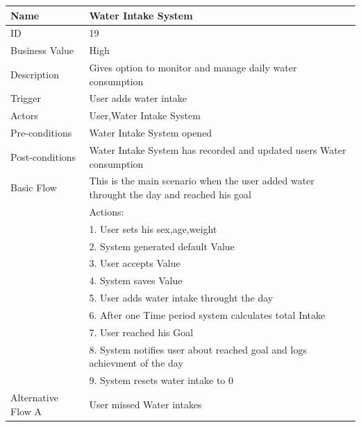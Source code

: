 \documentclass{article}
\begin{document}
\begin{table}[h!]
    \begin{tabularx}{\textwidth}{|>{\raggedright\arraybackslash}p{}|X|}
        \hline
        Name             & Water Intake System                               \\ \hline
        ID               & 19                                                                                     \\ \hline
        Business Value   & High                                                                                    \\ \hline
        Description      & Gives option to monitor and manage daily water consumption \\ \hline
        Trigger          & User adds water intake  \\ \hline
        Actors           & User,Water Intake System                                \\ \hline
        Pre-conditions   & Water Intake System opened                                 \\ \hline
        Post-conditions  & Water Intake System has recorded and updated users Water consumption                                                     \\ \hline
        Basic Flow       & This is the main scenario when the user added water throught the day and reached his goal \\ \hline
                         & Actions: \\
                         & 1. User sets his sex,age,weight\\
                         & 2. System generated default Value \\
                         & 3. User accepts Value \\
                         & 4. System saves Value \\
                         & 5. User adds water intake throught the day\\
                         & 6. After one Time period system calculates total Intake \\
                         & 7. User reached his Goal \\
                         & 8. System notifies user about reached goal and logs achievment of the day\\ 
                         & 9. System resets water intake to 0\\ \hline
        Alternative Flow A & User missed Water intakes  \\

\end{tabularx}
\end{table}
\end{document}
